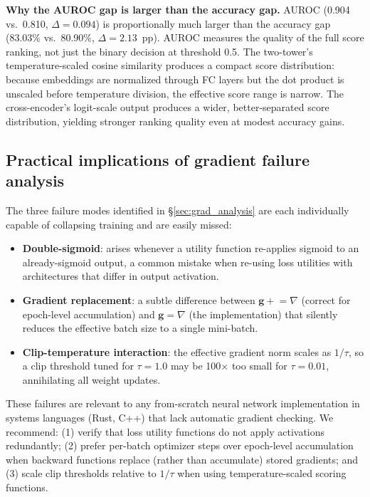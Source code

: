 \documentclass[10pt,twocolumn]{article}
\begin{document}
\textbf{Why the AUROC gap is larger than the accuracy gap.}
AUROC (0.904 vs.\ 0.810, $\Delta = 0.094$) is proportionally much larger than
the accuracy gap (83.03\% vs.\ 80.90\%, $\Delta = 2.13$~pp).
AUROC measures the quality of the full score ranking, not just the binary
decision at threshold 0.5.
The two-tower's temperature-scaled cosine similarity produces a compact score
distribution: because embeddings are normalized through FC layers but the
dot product is unscaled before temperature division, the effective score range
is narrow.
The cross-encoder's logit-scale output produces a wider, better-separated score
distribution, yielding stronger ranking quality even at modest accuracy gains.

\subsection{Practical implications of gradient failure analysis}

The three failure modes identified in \S\ref{sec:grad_analysis} are each
individually capable of collapsing training and are easily missed:

\begin{itemize}
    \item \textbf{Double-sigmoid}: arises whenever a utility function
    re-applies sigmoid to an already-sigmoid output, a common mistake when
    re-using loss utilities with architectures that differ in output activation.
    \item \textbf{Gradient replacement}: a subtle difference between $\mathbf{g}
    \mathrel{+}= \nabla$ (correct for epoch-level accumulation) and $\mathbf{g}
    \mathrel{=} \nabla$ (the implementation) that silently reduces the effective
    batch size to a single mini-batch.
    \item \textbf{Clip-temperature interaction}: the effective gradient norm
    scales as $1/\tau$, so a clip threshold tuned for $\tau = 1.0$ may be
    100$\times$ too small for $\tau = 0.01$, annihilating all weight updates.
\end{itemize}

These failures are relevant to any from-scratch neural network implementation
in systems languages (Rust, C++) that lack automatic gradient checking.
We recommend: (1) verify that loss utility functions do not apply activations
redundantly; (2) prefer per-batch optimizer steps over epoch-level accumulation
when backward functions replace (rather than accumulate) stored gradients; and
(3) scale clip thresholds relative to $1/\tau$ when using temperature-scaled
scoring functions.
\end{document}
